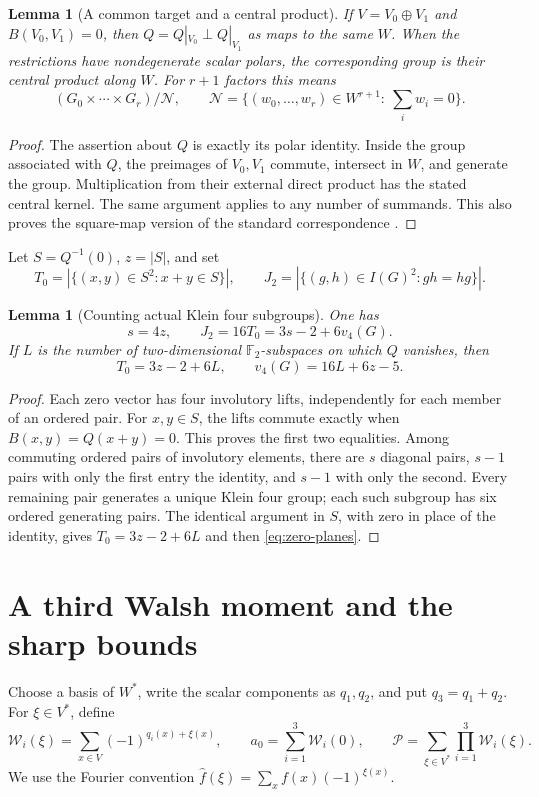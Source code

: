 \documentclass[11pt,a4paper]{article}
\newtheorem{lemma}[theorem]{Lemma}
\theoremstyle{definition}
\theoremstyle{remark}
\numberwithin{equation}{section}
\newcommand{\F}{\mathbb F}
\newcommand{\Walsh}{\mathcal W}
\newcommand{\Pm}{\mathcal P}
\newcommand{\vfour}{v_4}
\begin{document}
\begin{lemma}[A common target and a central product]\label{lem:central}
If \(V=V_0\oplus V_1\) and \(B(V_0,V_1)=0\), then
\(Q=Q|_{V_0}\perp Q|_{V_1}\) as maps to the \emph{same} \(W\).
When the restrictions have nondegenerate scalar polars, the corresponding
group is their central product along \(W\).
For \(r+1\) factors this means
\[
 (G_0\times\cdots\times G_r)/\mathcal N,\qquad
 \mathcal N=\{(w_0,\ldots,w_r)\in W^{r+1}:\ \textstyle\sum_iw_i=0\}.
\]
\end{lemma}
\begin{proof}
The assertion about \(Q\) is exactly its polar identity.
Inside the group associated with \(Q\), the preimages of \(V_0,V_1\)
commute, intersect in \(W\), and generate the group. Multiplication from
their external direct product has the stated central kernel. The same
argument applies to any number of summands. This also proves the
square-map version of the standard correspondence
\citep[Lemma 2.4]{KK12}.
\end{proof}

Let \(S=Q^{-1}(0)\), \(z=|S|\), and set
\[
 T_0=|\{(x,y)\in S^2:x+y\in S\}|,\qquad
 J_2=|\{(g,h)\in I(G)^2:gh=hg\}|.
\]
\begin{lemma}[Counting actual Klein four subgroups]\label{lem:count}
One has
\begin{equation}\label{eq:count}
 s=4z,\qquad J_2=16T_0=3s-2+6\vfour(G).
\end{equation}
If \(L\) is the number of two-dimensional \(\F_2\)-subspaces on which
\(Q\) vanishes, then
\begin{equation}\label{eq:zero-planes}
 T_0=3z-2+6L,\qquad \vfour(G)=16L+6z-5.
\end{equation}
\end{lemma}
\begin{proof}
Each zero vector has four involutory lifts, independently for each
member of an ordered pair. For \(x,y\in S\), the lifts commute exactly
when \(B(x,y)=Q(x+y)=0\). This proves the first two equalities.
Among commuting ordered pairs of involutory elements, there are \(s\)
diagonal pairs, \(s-1\) pairs with only the first entry the identity,
and \(s-1\) with only the second. Every remaining pair generates a unique
Klein four group; each such subgroup has six ordered generating pairs.
The identical argument in \(S\), with zero in place of the identity,
gives \(T_0=3z-2+6L\) and then \eqref{eq:zero-planes}.
\end{proof}

\section{A third Walsh moment and the sharp bounds}\label{sec:bounds}
Choose a basis of \(W^*\), write the scalar components as \(q_1,q_2\),
and put \(q_3=q_1+q_2\).
For \(\xi\in V^*\), define
\[
 \Walsh_i(\xi)=\sum_{x\in V}(-1)^{q_i(x)+\xi(x)},\qquad
 a_0=\sum_{i=1}^3\Walsh_i(0),\qquad
 \Pm=\sum_{\xi\in V^*}\prod_{i=1}^3\Walsh_i(\xi).
\]
We use the Fourier convention
\(\widehat f(\xi)=\sum_x f(x)(-1)^{\xi(x)}\).
\end{document}
